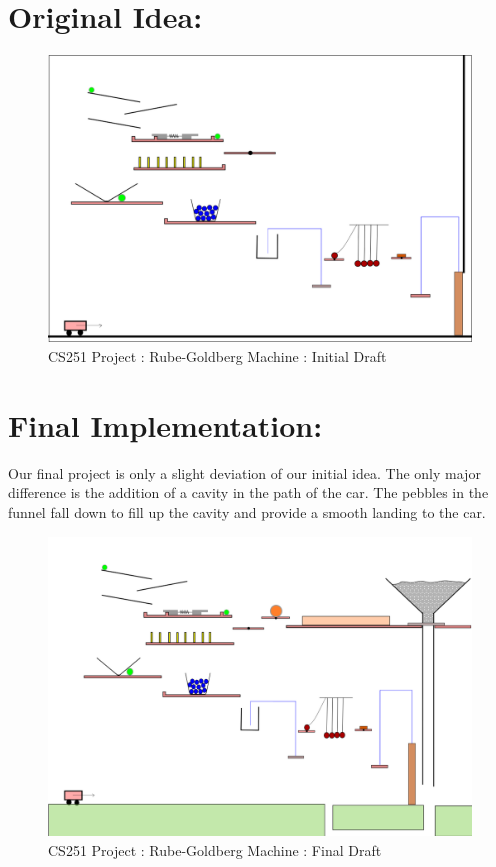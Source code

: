 \documentclass{article}
\begin{document}
\section*{Original Idea:}
\begin{figure} [h]
    \centering
    \includegraphics [scale=0.35] {images/cs251_project_1.png}
    \caption{CS251 Project : Rube-Goldberg Machine : Initial Draft}
\end{figure} 

\section*{Final Implementation:} Our final project is only a slight deviation of our initial idea. The only major difference is the addition of a cavity in the path of the car. The pebbles in the funnel fall down to fill up the cavity and provide a smooth landing to the car.

\begin{figure} [h]
    \centering
    \includegraphics [scale=0.48] {images/cs251_project_1_final.png}
    \caption{CS251 Project : Rube-Goldberg Machine : Final Draft}
\end{figure} 
\end{document}
